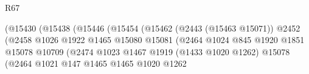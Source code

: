 \begin{lexlean}{R67}
\begin{coremodule}
                                                            (@15430
                                                              (@15438
                                                                (@15446
                                                                  (@15454
                                                                    (@15462
                                                                      (@2443 (@15463 @15071))
                                                                      @2452
                                                                      (@2458
                                                                        @1026
                                                                        @1922
                                                                        @1465
                                                                        @15080
                                                                        @15081
                                                                        (@2464
                                                                          @1024
                                                                          @845
                                                                          @1920
                                                                          @1851
                                                                          @15078
                                                                          @10709
                                                                          (@2474
                                                                            @1023
                                                                            @1467
                                                                            @1919
                                                                            (@1433 @1020 @1262)
                                                                            @15078
                                                                            (@2464
                                                                              @1021
                                                                              @147
                                                                              @1465
                                                                              @1465
                                                                              @1020
                                                                              @1262

\end{coremodule}
\end{lexlean}
